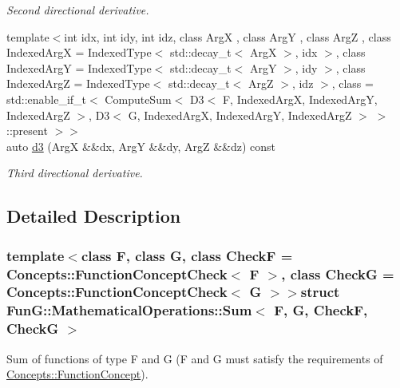\begin{DoxyCompactItemize}
\begin{DoxyCompactList}\small\item\em Second directional derivative. \end{DoxyCompactList}\item 
{\footnotesize template$<$int idx, int idy, int idz, class Arg\-X , class Arg\-Y , class Arg\-Z , class Indexed\-Arg\-X  = Indexed\-Type$<$ std\-::decay\-\_\-t$<$ Arg\-X $>$, idx $>$, class Indexed\-Arg\-Y  = Indexed\-Type$<$ std\-::decay\-\_\-t$<$ Arg\-Y $>$, idy $>$, class Indexed\-Arg\-Z  = Indexed\-Type$<$ std\-::decay\-\_\-t$<$ Arg\-Z $>$, idz $>$, class  = std\-::enable\-\_\-if\-\_\-t$<$                           Compute\-Sum$<$ D3$<$ F, Indexed\-Arg\-X, Indexed\-Arg\-Y, Indexed\-Arg\-Z $>$,                                       D3$<$ G, Indexed\-Arg\-X, Indexed\-Arg\-Y, Indexed\-Arg\-Z $>$ $>$\-::present $>$$>$ }\\auto \hyperlink{structFunG_1_1MathematicalOperations_1_1Sum_a03b4ee4cb48bf45992bef43322982635}{d3} (Arg\-X \&\&dx, Arg\-Y \&\&dy, Arg\-Z \&\&dz) const 
\begin{DoxyCompactList}\small\item\em Third directional derivative. \end{DoxyCompactList}\end{DoxyCompactItemize}


\subsection{Detailed Description}
\subsubsection*{template$<$class F, class G, class Check\-F = Concepts\-::\-Function\-Concept\-Check$<$ F $>$, class Check\-G = Concepts\-::\-Function\-Concept\-Check$<$ G $>$$>$struct Fun\-G\-::\-Mathematical\-Operations\-::\-Sum$<$ F, G, Check\-F, Check\-G $>$}

Sum of functions of type F and G (F and G must satisfy the requirements of \hyperlink{structFunG_1_1Concepts_1_1FunctionConcept}{Concepts\-::\-Function\-Concept}). 

